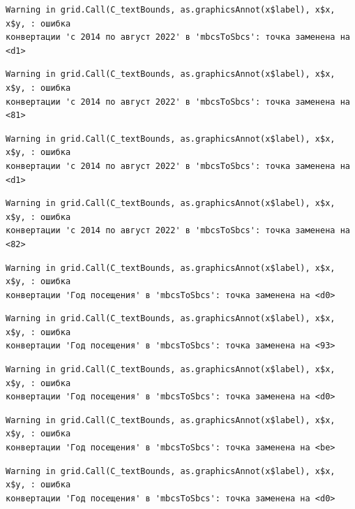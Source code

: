 \documentclass[
  letterpaper,
  DIV=11,
  numbers=noendperiod]{scrreprt}
\begin{document}
\begin{verbatim}
Warning in grid.Call(C_textBounds, as.graphicsAnnot(x$label), x$x, x$y, : ошибка
конвертации 'с 2014 по август 2022' в 'mbcsToSbcs': точка заменена на <d1>
\end{verbatim}

\begin{verbatim}
Warning in grid.Call(C_textBounds, as.graphicsAnnot(x$label), x$x, x$y, : ошибка
конвертации 'с 2014 по август 2022' в 'mbcsToSbcs': точка заменена на <81>
\end{verbatim}

\begin{verbatim}
Warning in grid.Call(C_textBounds, as.graphicsAnnot(x$label), x$x, x$y, : ошибка
конвертации 'с 2014 по август 2022' в 'mbcsToSbcs': точка заменена на <d1>
\end{verbatim}

\begin{verbatim}
Warning in grid.Call(C_textBounds, as.graphicsAnnot(x$label), x$x, x$y, : ошибка
конвертации 'с 2014 по август 2022' в 'mbcsToSbcs': точка заменена на <82>
\end{verbatim}

\begin{verbatim}
Warning in grid.Call(C_textBounds, as.graphicsAnnot(x$label), x$x, x$y, : ошибка
конвертации 'Год посещения' в 'mbcsToSbcs': точка заменена на <d0>
\end{verbatim}

\begin{verbatim}
Warning in grid.Call(C_textBounds, as.graphicsAnnot(x$label), x$x, x$y, : ошибка
конвертации 'Год посещения' в 'mbcsToSbcs': точка заменена на <93>
\end{verbatim}

\begin{verbatim}
Warning in grid.Call(C_textBounds, as.graphicsAnnot(x$label), x$x, x$y, : ошибка
конвертации 'Год посещения' в 'mbcsToSbcs': точка заменена на <d0>
\end{verbatim}

\begin{verbatim}
Warning in grid.Call(C_textBounds, as.graphicsAnnot(x$label), x$x, x$y, : ошибка
конвертации 'Год посещения' в 'mbcsToSbcs': точка заменена на <be>
\end{verbatim}

\begin{verbatim}
Warning in grid.Call(C_textBounds, as.graphicsAnnot(x$label), x$x, x$y, : ошибка
конвертации 'Год посещения' в 'mbcsToSbcs': точка заменена на <d0>
\end{verbatim}
\end{document}
